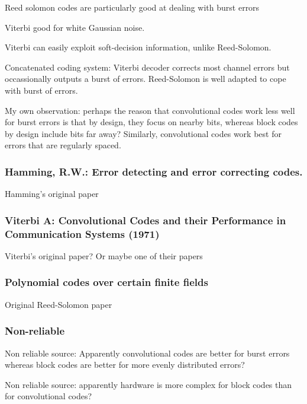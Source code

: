 \documentclass{article}
\begin{document}
Reed solomon codes are particularly good at dealing with burst errors

Viterbi good for white Gaussian noise.

Viterbi can easily exploit soft-decision information, unlike Reed-Solomon.

Concatenated coding system: Viterbi decoder corrects most channel errors but occassionally outputs a burst of errors. Reed-Solomon is well adapted to cope with burst of errors.

My own observation: perhaps the reason that convolutional codes work less well for burst errors is that by design, they focus on nearby bits, whereas block codes by design include bits far away? Similarly, convolutional codes work best for errors that are regularly spaced.

\subsubsection{Hamming, R.W.: Error detecting and error correcting codes.}

Hamming's original paper

\subsubsection{Viterbi A: Convolutional Codes and their Performance in
Communication Systems (1971)}

Viterbi's original paper? Or maybe one of their papers

\subsubsection{Polynomial codes over certain finite fields}

Original Reed-Solomon paper

\subsubsection{Non-reliable}

Non reliable source: Apparently convolutional codes are better for burst errors whereas block codes are better for more evenly distributed errors?

Non reliable source: apparently hardware is more complex for block codes than for convolutional codes?


\end{document}
